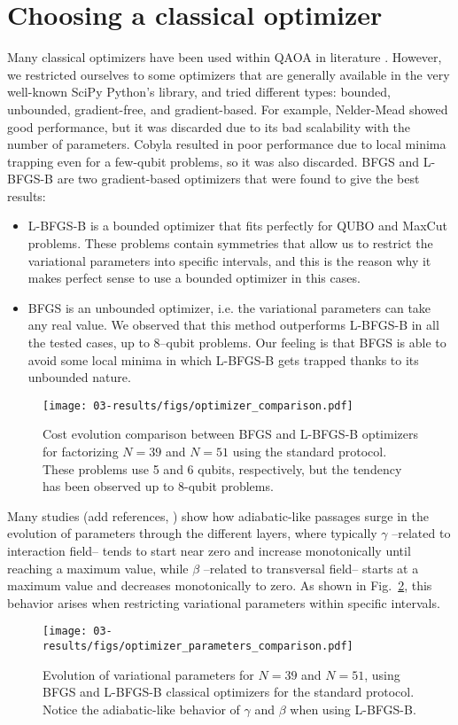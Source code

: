\section{Choosing a classical optimizer}
Many classical optimizers have been used within QAOA in literature \cite{blekos_review_2024}. However, we restricted ourselves
to some optimizers that are generally available in the very well-known SciPy Python's library, and tried different types: bounded,
unbounded, gradient-free, and gradient-based. For example, Nelder-Mead showed good performance, but it was discarded due to its bad
scalability with the number of parameters. Cobyla resulted in poor performance due to local minima trapping even for a few-qubit
problems, so it was also discarded. BFGS and L-BFGS-B are two gradient-based optimizers that were found to give the best results:
\begin{itemize}
    \item L-BFGS-B is a bounded optimizer that fits perfectly for QUBO and MaxCut problems. These problems contain symmetries
    that allow us to restrict the variational parameters into specific intervals, and this is the reason why it makes perfect
    sense to use a bounded optimizer in this cases.
    \item BFGS is an unbounded optimizer, i.e. the variational parameters can take any real value. We observed that this method
    outperforms L-BFGS-B in all the tested cases, up to 8--qubit problems. Our feeling is that BFGS is able to avoid some local
    minima in which L-BFGS-B gets trapped thanks to its unbounded nature.
\end{itemize}

\begin{figure}[h]
    \centering
    \texttt{[image: 03-results/figs/optimizer\_comparison.pdf]}
    \caption{Cost evolution comparison between BFGS and L-BFGS-B optimizers for factorizing $N=39$ and $N=51$
    using the standard protocol. These problems use 5 and 6 qubits, respectively, but the tendency has been observed
    up to 8-qubit problems.}
    \label{fig:optimizer_comparison}
\end{figure}

Many studies {\color{red} (add references, \cite{zhou_quantum_2020,diez-valle_universal_2025})} show how adiabatic-like passages surge in the
evolution of parameters through the different layers, where typically $\gamma$ --related to interaction field-- tends to start near
zero and increase monotonically until reaching a maximum value, while $\beta$ --related to transversal field-- starts at a maximum
value and decreases monotonically to zero. As shown in Fig.~\ref{fig:optimizer_parameter_comparison}, this behavior arises when
restricting variational parameters within specific intervals.

\begin{figure}[h]
    \centering
    \texttt{[image: 03-results/figs/optimizer\_parameters\_comparison.pdf]}
    \caption{Evolution of variational parameters for $N=39$ and $N=51$, using BFGS and L-BFGS-B classical optimizers for
    the standard protocol. Notice the adiabatic-like behavior of $\gamma$ and $\beta$ when using L-BFGS-B.}
    \label{fig:optimizer_parameter_comparison}
\end{figure}